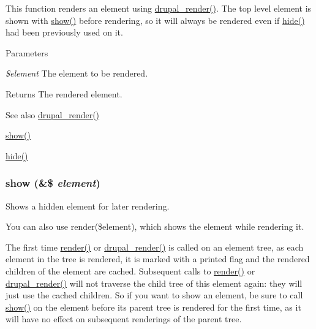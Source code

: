 This function renders an element using \hyperlink{common_8inc_a05798b44e8d6c496d4bee5cc32fa7851}{drupal\_\-render()}. The top level element is shown with \hyperlink{common_8inc_a5118f0601a3243a2d651369892b6cd47}{show()} before rendering, so it will always be rendered even if \hyperlink{common_8inc_aa57f04b6e1f5cdc3ed30abf98fd0fd3f}{hide()} had been previously used on it.


\begin{DoxyParams}{Parameters}
\item[{\em \$element}]The element to be rendered.\end{DoxyParams}
\begin{DoxyReturn}{Returns}
The rendered element.
\end{DoxyReturn}
\begin{DoxySeeAlso}{See also}
\hyperlink{common_8inc_a05798b44e8d6c496d4bee5cc32fa7851}{drupal\_\-render()} 

\hyperlink{common_8inc_a5118f0601a3243a2d651369892b6cd47}{show()} 

\hyperlink{common_8inc_aa57f04b6e1f5cdc3ed30abf98fd0fd3f}{hide()} 
\end{DoxySeeAlso}
\hypertarget{common_8inc_a5118f0601a3243a2d651369892b6cd47}{
\subsubsection[{show}]{\setlength{\rightskip}{0pt plus 5cm}show (\&\$ {\em element})}}
\label{common_8inc_a5118f0601a3243a2d651369892b6cd47}
Shows a hidden element for later rendering.

You can also use render(\$element), which shows the element while rendering it.

The first time \hyperlink{common_8inc_a5f4b2009c1caf78549203cec9b324305}{render()} or \hyperlink{common_8inc_a05798b44e8d6c496d4bee5cc32fa7851}{drupal\_\-render()} is called on an element tree, as each element in the tree is rendered, it is marked with a printed flag and the rendered children of the element are cached. Subsequent calls to \hyperlink{common_8inc_a5f4b2009c1caf78549203cec9b324305}{render()} or \hyperlink{common_8inc_a05798b44e8d6c496d4bee5cc32fa7851}{drupal\_\-render()} will not traverse the child tree of this element again: they will just use the cached children. So if you want to show an element, be sure to call \hyperlink{common_8inc_a5118f0601a3243a2d651369892b6cd47}{show()} on the element before its parent tree is rendered for the first time, as it will have no effect on subsequent renderings of the parent tree.


